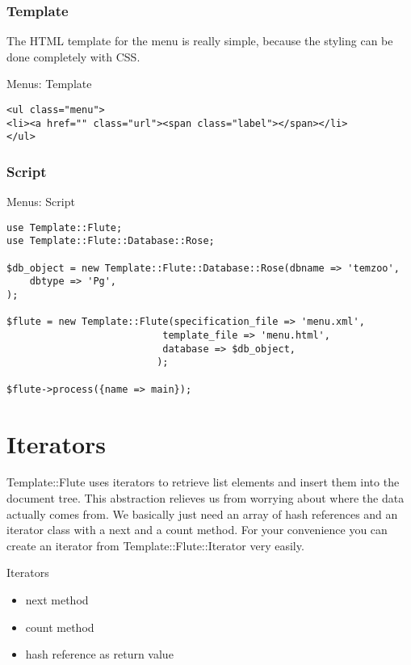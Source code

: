 \subsubsection{Template}
The HTML template for the menu is really simple, because the
styling can be done completely with CSS.

\begin{frame}[fragile]{Menus: Template}
\begin{lstlisting}
<ul class="menu">
<li><a href="" class="url"><span class="label"></span></li>
</ul>
\end{lstlisting}
\end{frame}

\subsubsection{Script}
\begin{frame}[fragile]{Menus: Script}
\begin{lstlisting}
use Template::Flute;
use Template::Flute::Database::Rose;

$db_object = new Template::Flute::Database::Rose(dbname => 'temzoo',
    dbtype => 'Pg',
);

$flute = new Template::Flute(specification_file => 'menu.xml',
						   template_file => 'menu.html',
						   database => $db_object,
						  );

$flute->process({name => main});
\end{lstlisting}
\end{frame}

\section{Iterators}
Template::Flute uses iterators to retrieve list elements and insert them into
the document tree. This abstraction relieves us from worrying about where
the data actually comes from. We basically just need an array of hash
references and an iterator class with a next and a count method. For your
convenience you can create an iterator from Template::Flute::Iterator
very easily.

\begin{frame}{Iterators}
\begin{itemize}
  \item next method
  \item count method
  \item hash reference as return value
 \end{itemize}
\end{frame}


